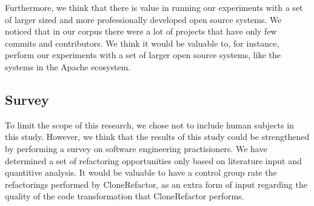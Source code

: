 Furthermore, we think that there is value in running our experiments with a set of larger sized and more professionally developed open source systems. We noticed that in our corpus there were a lot of projects that have only few commits and contributors. We think it would be valuable to, for instance, perform our experiments with a set of larger open source systems, like the systems in the Apache ecosystem.

\subsection{Survey}
To limit the scope of this research, we chose not to include human subjects in this study. However, we think that the results of this study could be strengthened by performing a survey on software engineering practisioners. We have determined a set of refactoring opportunities only based on literature input and quantitive analysis. It would be valuable to have a control group rate the refactorings performed by CloneRefactor, as an extra form of input regarding the quality of the code transformation that CloneRefactor performs.
